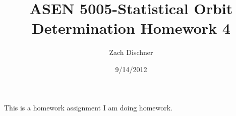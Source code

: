 \documentclass[11pt]{report}
\begin{document}
\title{ASEN 5005-Statistical Orbit Determination
Homework 4}
\author{Zach Dischner}
\date{9/14/2012}
\maketitle

This is a homework assignment 
 I am doing homework. 
 
 
\end{document}
